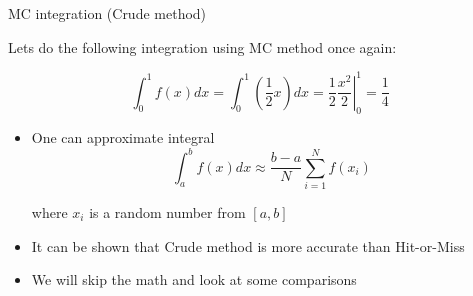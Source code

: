 \begin{slide}[toc=Crude method]{MC integration (Crude method)}
\null\vfill

  Lets do the following integration using MC method once again:
  
  $$\int_0^1 f(x)dx = \int_0^1 \left(\frac{1}{2}x\right) dx = \left.\frac{1}{2}\frac{x^2}{2}\right|_{0}^{1} = \frac{1}{4}$$
  \twocolumn
  {
    \begin{itemize}
      \item One can approximate integral
      \vspace{-5pt}
      $$\int_a^b f(x) dx \approx \frac{b - a}{N}\sum_{i=1}^{N} f(x_i)$$
     
      where $x_i$ is a random number from $[a, b]$
      
      \item It can be shown that Crude method is more accurate than Hit-or-Miss
      
      \item We will skip the math and look at some comparisons
      
    \end{itemize}
  }
  {
    
  }

\vfill\null
\end{slide}

